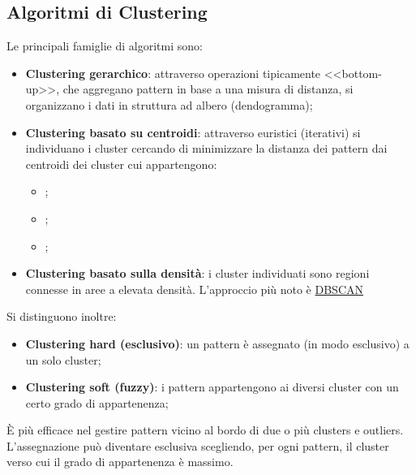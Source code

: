 \subsection{Algoritmi di Clustering}\label{sub:algoritmi_di_clustering} %
Le principali famiglie di algoritmi sono:
\begin{itemize}
    \item \textbf{Clustering gerarchico}: attraverso operazioni tipicamente <<bottom-up>>, che aggregano pattern in base a una misura di distanza, si organizzano i dati in struttura ad albero (dendogramma);
    \item \textbf{Clustering basato su centroidi}: attraverso euristici (iterativi) si individuano i cluster cercando di minimizzare la distanza dei pattern dai centroidi dei cluster cui appartengono:
        \begin{itemize}
            \item {};
            \item {};
            \item {};
        \end{itemize}
    \item \textbf{Clustering basato sulla densità}: i cluster individuati sono regioni connesse in aree a elevata densità.
        L'approccio più noto è \href{https://en.wikipedia.org/wiki/DBSCAN}{DBSCAN}
\end{itemize}
Si distinguono inoltre:
\begin{itemize}
    \item \textbf{Clustering hard (esclusivo)}: un pattern è assegnato (in modo esclusivo) a un solo cluster;
    \item \textbf{Clustering soft (fuzzy)}: i pattern appartengono ai diversi cluster con un certo grado di appartenenza;
\end{itemize}
È più efficace nel gestire pattern vicino al bordo di due o più clusters e outliers.
L'assegnazione può diventare esclusiva scegliendo, per ogni pattern, il cluster verso cui il grado di appartenenza è massimo.
